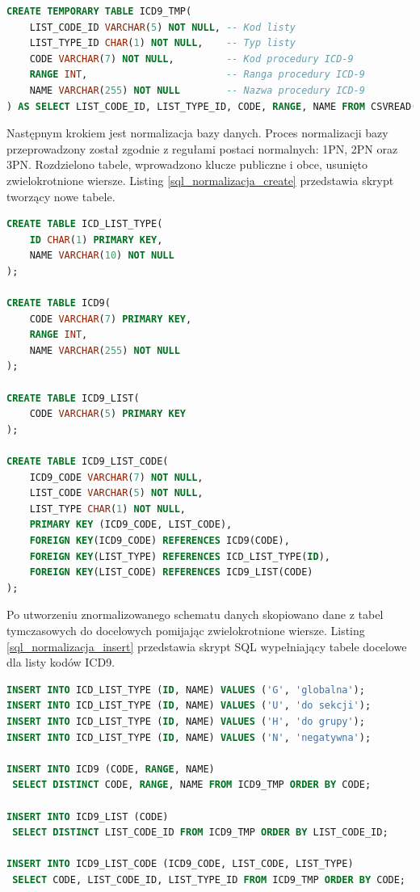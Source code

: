 \begin{lstlisting}[language=SQL,caption={Import listy kodów ICD9 z pliku CSV. Autor: Mateusz Urbanik},label=sql_import_csv]
CREATE TEMPORARY TABLE ICD9_TMP(
    LIST_CODE_ID VARCHAR(5) NOT NULL, -- Kod listy
    LIST_TYPE_ID CHAR(1) NOT NULL,    -- Typ listy
    CODE VARCHAR(7) NOT NULL,         -- Kod procedury ICD-9
    RANGE INT,                        -- Ranga procedury ICD-9
    NAME VARCHAR(255) NOT NULL        -- Nazwa procedury ICD-9
) AS SELECT LIST_CODE_ID, LIST_TYPE_ID, CODE, RANGE, NAME FROM CSVREAD('icd9.csv');
\end{lstlisting}

Następnym krokiem jest normalizacja bazy danych. Proces normalizacji bazy przeprowadzony został zgodnie z regułami postaci normalnych: 1PN, 2PN oraz 3PN\cite{bazy_mimuw}. Rozdzielono tabele, wprowadzono klucze publiczne i obce, usunięto zwielokrotnione wiersze. Listing \ref{sql_normalizacja_create} przedstawia skrypt tworzący nowe tabele.
\newpage
\begin{lstlisting}[language=SQL,caption={Normalizacja - tworzenie tabel dla listy kodów ICD9. Autor: Mateusz Urbanik},label=sql_normalizacja_create]
CREATE TABLE ICD_LIST_TYPE(
    ID CHAR(1) PRIMARY KEY,
    NAME VARCHAR(10) NOT NULL
);

CREATE TABLE ICD9(
    CODE VARCHAR(7) PRIMARY KEY,
    RANGE INT,
    NAME VARCHAR(255) NOT NULL
);

CREATE TABLE ICD9_LIST(
    CODE VARCHAR(5) PRIMARY KEY
);

CREATE TABLE ICD9_LIST_CODE(
    ICD9_CODE VARCHAR(7) NOT NULL,
    LIST_CODE VARCHAR(5) NOT NULL,
    LIST_TYPE CHAR(1) NOT NULL,
    PRIMARY KEY (ICD9_CODE, LIST_CODE),
    FOREIGN KEY(ICD9_CODE) REFERENCES ICD9(CODE),
    FOREIGN KEY(LIST_TYPE) REFERENCES ICD_LIST_TYPE(ID),
    FOREIGN KEY(LIST_CODE) REFERENCES ICD9_LIST(CODE)
);
\end{lstlisting}

Po utworzeniu znormalizowanego schematu danych skopiowano dane z tabel tymczasowych do docelowych pomijając zwielokrotnione wiersze. Listing \ref{sql_normalizacja_insert} przedstawia skrypt SQL wypełniający tabele docelowe dla listy kodów ICD9.

\begin{lstlisting}[language=SQL,caption={Normalizacja - wypełnianie tabel danymi dla listy kodów ICD9. Autor: Mateusz Urbanik},label=sql_normalizacja_insert]
INSERT INTO ICD_LIST_TYPE (ID, NAME) VALUES ('G', 'globalna');
INSERT INTO ICD_LIST_TYPE (ID, NAME) VALUES ('U', 'do sekcji');
INSERT INTO ICD_LIST_TYPE (ID, NAME) VALUES ('H', 'do grupy');
INSERT INTO ICD_LIST_TYPE (ID, NAME) VALUES ('N', 'negatywna');

INSERT INTO ICD9 (CODE, RANGE, NAME)
 SELECT DISTINCT CODE, RANGE, NAME FROM ICD9_TMP ORDER BY CODE;

INSERT INTO ICD9_LIST (CODE)
 SELECT DISTINCT LIST_CODE_ID FROM ICD9_TMP ORDER BY LIST_CODE_ID;

INSERT INTO ICD9_LIST_CODE (ICD9_CODE, LIST_CODE, LIST_TYPE)
 SELECT CODE, LIST_CODE_ID, LIST_TYPE_ID FROM ICD9_TMP ORDER BY CODE;
\end{lstlisting}

